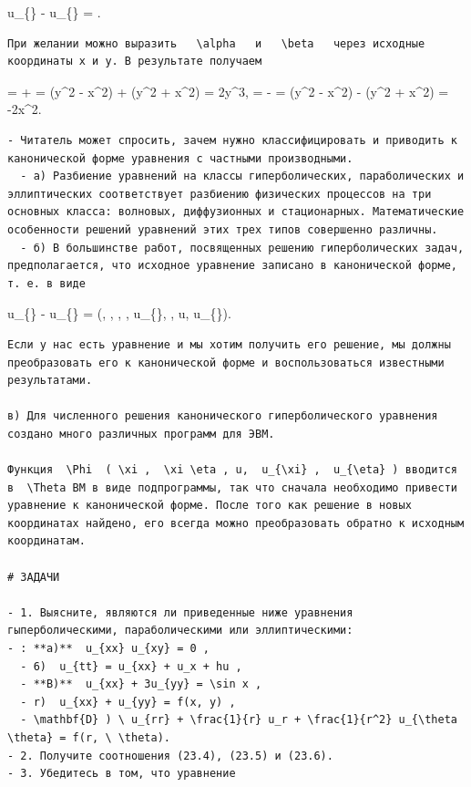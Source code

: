 \documentclass[
  ukrainian,
]{article}
\begin{document}
u\_\{\alpha\alpha\} - u\_\{\beta\beta\} =
.

\begin{verbatim}
При желании можно выразить   \alpha   и   \beta   через исходные координаты x и y. В результате получаем
\end{verbatim}

\alpha = \xi + \eta = (y\^{}2 - x\^{}2) + (y\^{}2 + x\^{}2) = 2y\^{}3,
\beta = \xi - \eta = (y\^{}2 - x\^{}2) - (y\^{}2 + x\^{}2) = -2x\^{}2.

\begin{verbatim}
- Читатель может спросить, зачем нужно классифицировать и приводить к канонической форме уравнения с частными производными.
  - а) Разбиение уравнений на классы гиперболических, параболических и эллиптических соответствует разбиению физических процессов на три основных класса: волновых, диффузионных и стационарных. Математические особенности решений уравнений этих трех типов совершенно различны.
  - б) В большинстве работ, посвященных решению гиперболических задач, предполагается, что исходное уравнение записано в канонической форме, т. е. в виде
\end{verbatim}

u\_\{\xi\xi\} - u\_\{\eta\eta\} = \Psi(\xi, , \eta, , u\_\{\xi\}, , u,
u\_\{\eta\}).

\begin{verbatim}
Если у нас есть уравнение и мы хотим получить его решение, мы должны преобразовать его к канонической форме и воспользоваться известными результатами.

в) Для численного решения канонического гиперболического уравнения создано много различных программ для ЭВМ.

Функция  \Phi  ( \xi ,  \xi \eta , u,  u_{\xi} ,  u_{\eta} ) вводится в  \Theta ВМ в виде подпрограммы, так что сначала необходимо привести уравнение к канонической форме. После того как решение в новых координатах найдено, его всегда можно преобразовать обратно к исходным координатам.

# ЗАДАЧИ

- 1. Выясните, являются ли приведенные ниже уравнения гыперболическими, параболическими или эллиптическими:
- : **a)**  u_{xx} u_{xy} = 0 ,
  - 6)  u_{tt} = u_{xx} + u_x + hu ,
  - **B)**  u_{xx} + 3u_{yy} = \sin x ,
  - r)  u_{xx} + u_{yy} = f(x, y) ,
  - \mathbf{D} ) \ u_{rr} + \frac{1}{r} u_r + \frac{1}{r^2} u_{\theta \theta} = f(r, \ \theta).
- 2. Получите соотношения (23.4), (23.5) и (23.6).
- 3. Убедитесь в том, что уравнение
\end{verbatim}
\end{document}

